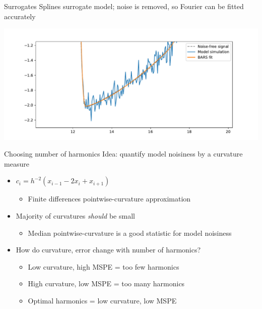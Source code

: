 \documentclass[presentation]{beamer}
\begin{document}
\begin{frame}[label={sec:orgcf640fc}]{Surrogates}
Splines surrogate model; noise is removed, so Fourier can be fitted accurately

\begin{center}
\includegraphics[width=.9\linewidth]{./barsd.pdf}
\end{center}
\end{frame}
\begin{frame}[label={sec:org75f01d8}]{Choosing number of harmonics}
Idea: quantify model noisiness by a curvature measure
\vfill

\begin{itemize}
\item \(c_i = h^{-2}(x_{i-1} - 2x_i + x_{i+1})\)
\begin{itemize}
\item Finite differences pointwise-curvature approximation
\end{itemize}
\end{itemize}
\vfill
\begin{itemize}
\item Majority of curvatures \emph{should} be small
\begin{itemize}
\item Median pointwise-curvature is a good statistic for model noisiness
\end{itemize}
\end{itemize}
\vfill
\begin{itemize}
\item How do curvature, error change with number of harmonics?
\begin{itemize}
\item Low curvature, high MSPE = too few harmonics
\item High curvature, low MSPE = too many harmonics
\item Optimal harmonics = low curvature, low MSPE
\end{itemize}
\end{itemize}
\end{frame}
\end{document}
